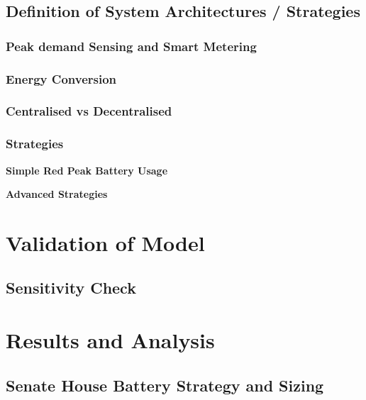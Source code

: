\subsection{Definition of System Architectures /
Strategies}\label{definition-of-system-architectures-strategies}

\subsubsection{Peak demand Sensing and Smart
Metering}\label{peak-demand-sensing-and-smart-metering}

\subsubsection{Energy Conversion}\label{energy-conversion}

\subsubsection{Centralised vs
Decentralised}\label{centralised-vs-decentralised}

\subsubsection{Strategies}\label{strategies}

\textbf{Simple Red Peak Battery Usage}

\textbf{Advanced Strategies}

\section{Validation of Model}\label{validation-of-model}

\subsection{Sensitivity Check}\label{sensitivity-check}

\section{Results and Analysis}\label{results-and-analysis}

\subsection{Senate House Battery Strategy and
Sizing}\label{senate-house-battery-strategy-and-sizing}

